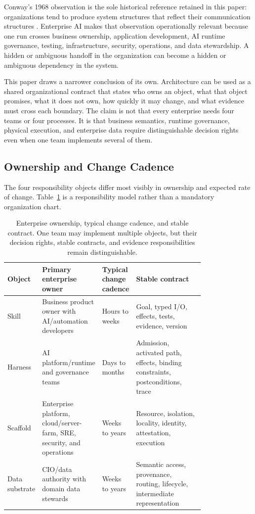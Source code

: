 Conway's 1968 observation is the sole historical reference retained in this paper: organizations tend to produce system structures that reflect their communication structures \cite{conway1968committees}. Enterprise AI makes that observation operationally relevant because one run crosses business ownership, application development, AI runtime governance, testing, infrastructure, security, operations, and data stewardship. A hidden or ambiguous handoff in the organization can become a hidden or ambiguous dependency in the system.

This paper draws a narrower conclusion of its own. Architecture can be used as a shared organizational contract that states who owns an object, what that object promises, what it does not own, how quickly it may change, and what evidence must cross each boundary. The claim is not that every enterprise needs four teams or four processes. It is that business semantics, runtime governance, physical execution, and enterprise data require distinguishable decision rights even when one team implements several of them.

\subsection{Ownership and Change Cadence}

The four responsibility objects differ most visibly in ownership and expected rate of change. Table~\ref{tab:ownership-cadence} is a responsibility model rather than a mandatory organization chart.

\begin{table}[t]
\centering
\caption{Enterprise ownership, typical change cadence, and stable contract. One team may implement multiple objects, but their decision rights, stable contracts, and evidence responsibilities remain distinguishable.}
\label{tab:ownership-cadence}
\begin{tabular}{lp{0.26\linewidth}p{0.15\linewidth}p{0.38\linewidth}}
\hline
Object & Primary enterprise owner & Typical change cadence & Stable contract \\
\hline
Skill & Business product owner with AI/automation developers & Hours to weeks & Goal, typed I/O, effects, tests, evidence, version \\
Harness & AI platform/runtime and governance teams & Days to months & Admission, activated path, effects, binding constraints, postconditions, trace \\
Scaffold & Enterprise platform, cloud/server-farm, SRE, security, and operations & Weeks to years & Resource, isolation, locality, identity, attestation, execution \\
Data substrate & CIO/data authority with domain data stewards & Weeks to years & Semantic access, provenance, routing, lifecycle, intermediate representation \\
\hline
\end{tabular}
\end{table}

